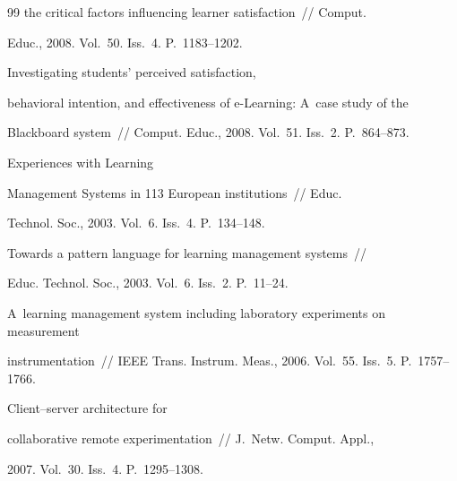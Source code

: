 {{\begin{thebibliography}{99}
the critical factors influencing learner satisfaction~/\!\!/ Comput. 


Educ., 2008. Vol.~50. Iss.~4. P.~1183--1202.







 Investigating students' perceived satisfaction, 


behavioral intention, and effectiveness of e-Learning: A~case study of the 


Blackboard system~/\!\!/ Comput. Educ., 2008. Vol.~51. Iss.~2. P.~864--873.







 Experiences with Learning 


Management Systems in 113 European institutions~/\!\!/ Educ. 


Technol. Soc., 2003. Vol.~6. Iss.~4. P.~134--148.









Towards a pattern language for learning management systems~/\!\!/ 


Educ. Technol. Soc., 2003. Vol.~6. Iss.~2. P.~11--24.









A~learning management system including laboratory experiments on measurement 


instrumentation~/\!\!/ IEEE Trans. Instrum. Meas., 2006. Vol.~55. Iss.~5. P.~1757--1766.







 Client--server architecture for 


collaborative remote experimentation~/\!\!/ J.~Netw. Comput. Appl., 


2007. Vol.~30. Iss.~4. P.~1295--1308.






\end{thebibliography}}}
